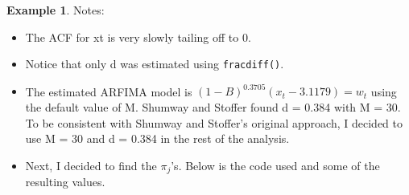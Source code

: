 \documentclass[
]{book}
\newenvironment{Shaded}{\begin{snugshade}}{\end{snugshade}}
\newcommand{\CommentTok}[1]{\textcolor[rgb]{0.56,0.35,0.01}{\textit{#1}}}
\newcommand{\ControlFlowTok}[1]{\textcolor[rgb]{0.13,0.29,0.53}{\textbf{#1}}}
\newcommand{\DecValTok}[1]{\textcolor[rgb]{0.00,0.00,0.81}{#1}}
\newcommand{\FunctionTok}[1]{\textcolor[rgb]{0.00,0.00,0.00}{#1}}
\newcommand{\NormalTok}[1]{#1}
\newcommand{\OtherTok}[1]{\textcolor[rgb]{0.56,0.35,0.01}{#1}}
\newcommand{\SpecialCharTok}[1]{\textcolor[rgb]{0.00,0.00,0.00}{#1}}
\providecommand{\tightlist}{%
  \setlength{\itemsep}{0pt}\setlength{\parskip}{0pt}}
\theoremstyle{definition}
\theoremstyle{definition}
\newtheorem{example}{Example}[chapter]
\theoremstyle{definition}
\theoremstyle{definition}
\theoremstyle{remark}
\begin{document}
\begin{example}
Notes:

\begin{itemize}
\tightlist
\item
  The ACF for xt is very slowly tailing off to 0.\\
\item
  Notice that only d was estimated using \texttt{fracdiff()}.\\
\item
  The estimated ARFIMA model is \((1-B)^{0.3705}(x_t-3.1179) = w_t\) using the default value of M. Shumway and Stoffer found d = 0.384 with M = 30. To be consistent with Shumway and Stoffer's original approach, I decided to use M = 30 and d = 0.384 in the rest of the analysis.\\
\item
  Next, I decided to find the \(\pi_j\)'s. Below is the code used and some of the resulting values.
\end{itemize}

\begin{Shaded}
\end{Shaded}
\end{example}
\end{document}
